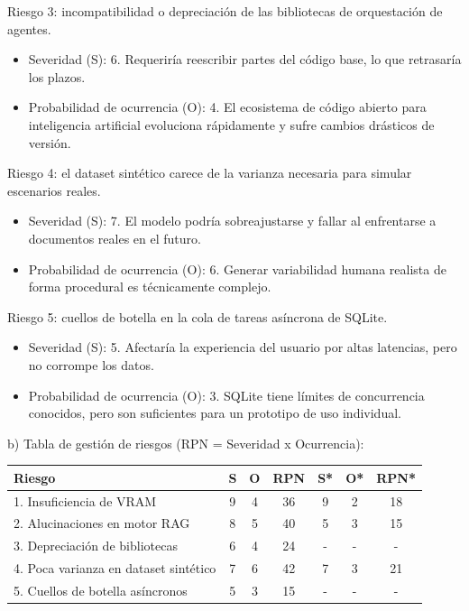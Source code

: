\documentclass[
11pt, %
]{charter}
\begin{document}
Riesgo 3: incompatibilidad o depreciación de las bibliotecas de orquestación de agentes.
\begin{itemize}
	\item Severidad (S): 6. Requeriría reescribir partes del código base, lo que retrasaría los plazos.
	\item Probabilidad de ocurrencia (O): 4. El ecosistema de código abierto para inteligencia artificial evoluciona rápidamente y sufre cambios drásticos de versión.
\end{itemize}

Riesgo 4: el dataset sintético carece de la varianza necesaria para simular escenarios reales.
\begin{itemize}
	\item Severidad (S): 7. El modelo podría sobreajustarse y fallar al enfrentarse a documentos reales en el futuro.
	\item Probabilidad de ocurrencia (O): 6. Generar variabilidad humana realista de forma procedural es técnicamente complejo.
\end{itemize}

Riesgo 5: cuellos de botella en la cola de tareas asíncrona de SQLite.
\begin{itemize}
	\item Severidad (S): 5. Afectaría la experiencia del usuario por altas latencias, pero no corrompe los datos.
	\item Probabilidad de ocurrencia (O): 3. SQLite tiene límites de concurrencia conocidos, pero son suficientes para un prototipo de uso individual.
\end{itemize}

b) Tabla de gestión de riesgos (RPN = Severidad x Ocurrencia):

\begin{table}[htpb]
\centering
\begin{tabularx}{\linewidth}{@{}|X|c|c|c|c|c|c|@{}}
\hline
\rowcolor[HTML]{C0C0C0} 
Riesgo & S & O & RPN & S* & O* & RPN* \\ \hline
1. Insuficiencia de VRAM & 9 & 4 & 36 & 9 & 2 & 18 \\ \hline
2. Alucinaciones en motor RAG & 8 & 5 & 40 & 5 & 3 & 15 \\ \hline
3. Depreciación de bibliotecas & 6 & 4 & 24 & - & - & - \\ \hline
4. Poca varianza en dataset sintético & 7 & 6 & 42 & 7 & 3 & 21 \\ \hline
5. Cuellos de botella asíncronos & 5 & 3 & 15 & - & - & - \\ \hline
\end{tabularx}%
\end{table}
\end{document}
